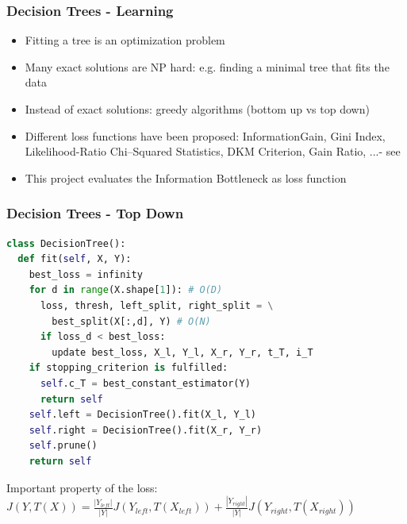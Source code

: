 \begin{frame}
   \frametitle{Decision Trees - Learning}  
   \begin{itemize}
   \item Fitting a tree is an optimization problem
   \item Many exact solutions are NP hard: e.g. finding a minimal tree that fits the data
   \item Instead of exact solutions: greedy algorithms (bottom up vs top down)
   \item Different loss functions have been proposed: \newline
   InformationGain, Gini Index,  Likelihood-Ratio Chi–Squared Statistics, DKM Criterion, Gain Ratio, ...- see \cite{rokach_decision_2005}
   \item This project evaluates the Information Bottleneck as loss function 
   \end{itemize}
\end{frame}



\begin{frame}[fragile]
   \frametitle{Decision Trees - Top Down}  
   \begin{lstlisting}[language=Python, basicstyle=\small]
class DecisionTree():
  def fit(self, X, Y):
    best_loss = infinity
    for d in range(X.shape[1]): # O(D) 
      loss, thresh, left_split, right_split = \
        best_split(X[:,d], Y) # O(N)
      if loss_d < best_loss:
        update best_loss, X_l, Y_l, X_r, Y_r, t_T, i_T
    if stopping_criterion is fulfilled:
      self.c_T = best_constant_estimator(Y)
      return self
    self.left = DecisionTree().fit(X_l, Y_l)
    self.right = DecisionTree().fit(X_r, Y_r)
    self.prune()
    return self
\end{lstlisting}

Important property of the loss: $J(Y, T(X)) = \frac{|Y_{left}|}{|Y|}J(Y_{left}, T(X_{left})) + \frac{|Y_{right}|}{|Y|}J(Y_{right}, T(X_{right}))$
\end{frame}
